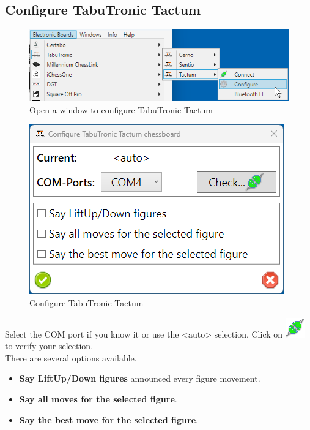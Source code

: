 \documentclass[11pt,a4paper]{article}
\begin{document}
\subsection{Configure TabuTronic Tactum} \label{ConfigureTabuTronicTactum}

\begin{figure}[H]
	\centering
	\includegraphics[scale=0.8]{Tactum1.png}
	\caption{Open a window to configure TabuTronic Tactum }
	\label{fig:Tactum1}
\end{figure}


\begin{figure}[H]
	\centering
	\includegraphics[scale=1.0]{Tactum2.png}
	\caption{Configure TabuTronic Tactum}
	\label{fig:Tactum2}
\end{figure}

Select the COM port if you know it or use the <auto> selection. 
Click on \includegraphics[scale=0.5]{connect.png} to verify your selection.\\
There are several options available.
\begin{itemize}
	\item \textbf{Say LiftUp/Down figures} announced every figure movement.
	\item \textbf{Say all moves for the selected figure}.
	\item \textbf{Say the best move for the selected figure}.
\end{itemize}
\end{document}
